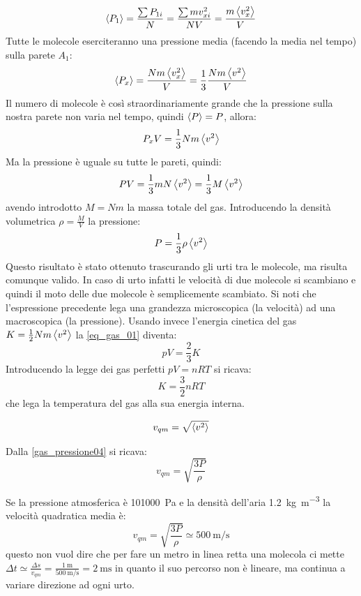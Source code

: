 \[\left<P_{1}\right> = \frac{\sum P_{1i}}{N}=\frac{\sum m v_{xi}^2}{NV}=\frac{m\left<v_x^2\right>}{V}\]
Tutte le molecole eserciteranno una pressione media (facendo la media nel tempo) sulla parete $A_1$:
\begin{equation}
   \left<P_x\right>=\frac{Nm\left<v_x^2\right>}{V}=\frac{1}{3}\frac{Nm\left<v^2\right>}{V}
\end{equation}
Il numero di molecole è così straordinariamente grande che la pressione sulla nostra parete non varia nel tempo, quindi $\left<P\right>=P$, allora:
\[P_x V=\frac{1}{3}Nm\left<v^2\right>\]
Ma la pressione è uguale su tutte le pareti, quindi:
\begin{equation}
   PV=\frac{1}{3}mN\left<v^2\right>=\frac{1}{3}M\left<v^2\right>
   \label{eq_gas_01}
\end{equation}
avendo introdotto $M=Nm$ la massa totale del gas. Introducendo la densità volumetrica $\rho=\frac{M}{V}$ la pressione:
\begin{equation}
   P=\frac{1}{3}\rho\left<v^2\right>
   \label{gas_pressione04}
\end{equation}
Questo risultato è stato ottenuto trascurando gli urti tra le molecole, ma risulta comunque valido. In caso di urto infatti le velocità di due molecole si scambiano e quindi il moto delle due molecole è semplicemente scambiato. Si noti che l'espressione precedente lega una grandezza microscopica (la velocità) ad una macroscopica (la pressione).
Usando invece l'energia cinetica del gas $K=\frac{1}{2}Nm\left<v^2\right>$ la \eqref{eq_gas_01} diventa:
\begin{equation}
   pV=\frac{2}{3}K
\end{equation}
Introducendo la legge dei gas perfetti $pV=nRT$ si ricava:
\begin{equation}
   K = \frac{3}{2}nRT
\end{equation}
che lega la temperatura del gas alla sua energia interna.
\begin{Def}
   \begin{equation}
      v_{qm}=\sqrt{\left<v^2\right>}
   \end{equation}
\end{Def}
Dalla \eqref{gas_pressione04} si ricava:
\begin{equation}
   v_{qm}=\sqrt{\frac{3P}{\rho}}
\end{equation}
\begin{Es}
   Se la pressione atmosferica è \SI{101000}{\pascal} e la densità dell'aria \SI{1.2}{\kilo\gram\per\cubic\meter} la velocità quadratica media è:
   \[
      v_{qm}=\sqrt{\frac{3P}{\rho}}\simeq\SI{500}{\meter\per\second}
   \]
   questo non vuol dire che per fare un metro in linea retta una molecola ci mette $\Delta t \simeq \frac{\Delta s}{v_{qm}}=\frac{\SI{1}{\meter}}{\SI{500}{\meter\per\second}}=\SI{2}{\milli\second}$ in quanto il suo percorso non è lineare, ma continua a variare direzione ad ogni urto.
\end{Es}

